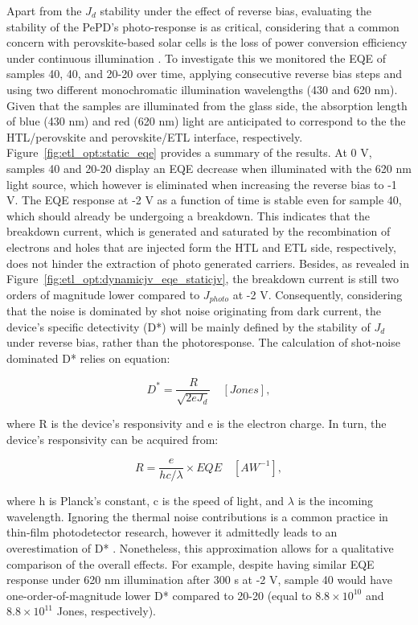Apart from the $J_d$ stability under the effect of reverse bias, evaluating the stability of the PePD's photo-response is as critical, considering that a common concern with perovskite-based solar cells is the loss of power conversion efficiency under continuous illumination \cite{Song2022CriticalAdditives, Fu2019I2Conditions,Khadka2021InsightsJunction}. To investigate this we monitored the EQE of samples 40, 40, and 20-20 over time, applying consecutive reverse bias steps and using two different monochromatic illumination wavelengths (430 and 620 nm). Given that the samples are illuminated from the glass side, the absorption length of blue (430 nm) and red (620 nm) light are anticipated to correspond to the the HTL/perovskite and perovskite/ETL interface, respectively. Figure~\ref{fig:etl_opt:static_eqe} provides a summary of the results. At 0 V, samples 40 and 20-20 display an EQE decrease when illuminated with the 620 nm light source, which however is eliminated when increasing the reverse bias to -1 V. The EQE response at -2 V as a function of time is stable even for sample 40, which should already be undergoing a breakdown. This indicates that the breakdown current, which is generated and saturated by the recombination of electrons and holes that are injected form the HTL and ETL side, respectively, does not hinder the extraction of photo generated carriers. Besides, as revealed in Figure~\ref{fig:etl_opt:dynamicjv_eqe_staticjv}, the breakdown current is still two orders of magnitude lower compared to $J_{photo}$ at -2 V. Consequently, considering that the noise is dominated by shot noise originating from dark current, the device's specific detectivity (D*) will be mainly defined by the stability of $J_d$ under reverse bias, rather than the photoresponse. The calculation of shot-noise dominated D* relies on equation:  

\begin{equation}
    D^* = \frac{R}{\sqrt{2eJ_d}} \quad [Jones],
\end{equation}  

where R is the device's responsivity and e is the electron charge. In turn, the device's responsivity can be acquired from: 

\begin{equation}
    R = \frac{e}{hc/\lambda} \times EQE \quad [AW^{-1}],    
\end{equation}

where h is Planck's constant, c is the speed of light, and $\lambda$ is the incoming wavelength. Ignoring the thermal noise contributions is a common practice in thin-film photodetector research, however it admittedly leads to an overestimation of D* \cite{Martinez-Goyeneche2024Vacuum-DepositedDetection}. Nonetheless, this approximation allows for a qualitative comparison of the overall effects. For example, despite having similar EQE response under 620 nm illumination after 300 s at -2 V, sample 40 would have one-order-of-magnitude lower D* compared to 20-20 (equal to $8.8\times 10^{10}$ and  $8.8\times 10^{11}$ Jones, respectively). 

